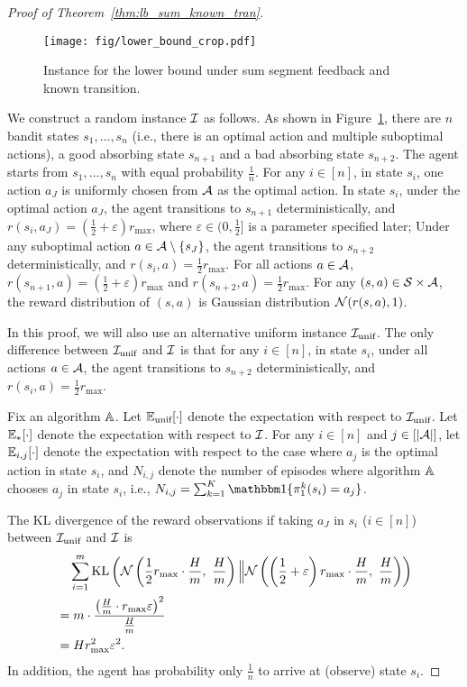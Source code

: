\begin{proof}[Proof of Theorem~\ref{thm:lb_sum_known_tran}]
	\begin{figure}[t]
		\centering   
		\texttt{[image: fig/lower\_bound\_crop.pdf]}
		\caption{Instance for the lower bound under sum segment feedback and known transition.
		} \label{fig:lb_sum_known_tran}
	\end{figure}
	
	We construct a random instance $\mathcal{I}$ as follows. As shown in Figure~\ref{fig:lb_sum_known_tran},
	there are $n$ bandit states $s_1,\dots,s_n$ (i.e., there is an optimal action and multiple suboptimal actions), a good absorbing state $s_{n+1}$ and a bad absorbing state $s_{n+2}$. 
	The agent starts from $s_1,\dots,s_n$ with equal probability $\frac{1}{n}$. 
	For any $i \in [n]$, in state $s_i$, one action $a_J$ is uniformly chosen from $\mathcal{A}$ as the optimal action.
	In state $s_i$, under the optimal action $a_J$, the agent transitions to $s_{n+1}$ deterministically, and $r(s_i,a_J)=(\frac{1}{2}+\varepsilon)r_{\max}$, where $\varepsilon \in (0,\frac{1}{2}]$ is a parameter specified later; Under any suboptimal action $a \in \mathcal{A} \setminus \{s_J\}$, the agent transitions to $s_{n+2}$ deterministically, and $r(s_i,a)=\frac{1}{2}r_{\max}$. 
	For all actions $a \in \mathcal{A}$, $r(s_{n+1},a)=(\frac{1}{2}+\varepsilon)r_{\max}$ and $r(s_{n+2},a)=\frac{1}{2}r_{\max}$.
	For any $(s,a) \in \mathcal{S} \times \mathcal{A}$, the reward distribution of $(s,a)$ is Gaussian distribution $\mathcal{N}(r(s,a),1)$.
	
	In this proof, we will also use an alternative uniform instance $\mathcal{I}_{\textup{unif}}$. The only difference between $\mathcal{I}_{\textup{unif}}$ and $\mathcal{I}$ is that for any $i \in [n]$, in state $s_i$, under all actions $a \in \mathcal{A}$, the agent transitions to $s_{n+2}$ deterministically, and $r(s_i,a)=\frac{1}{2}r_{\max}$.
	
	Fix an algorithm $\mathbb{A}$.
	Let $\mathbb{E}_{\textup{unif}}[\cdot]$ denote the expectation with respect to $\mathcal{I}_{\textup{unif}}$. Let $\mathbb{E}_*[\cdot]$ denote the expectation with respect to $\mathcal{I}$. For any $i \in [n]$ and $j \in [|\mathcal{A}|]$, let $\mathbb{E}_{i,j}[\cdot]$ denote the expectation with respect to the case where $a_j$ is the optimal action in state $s_i$, and  $N_{i,j}$ denote the number of episodes where algorithm $\mathbb{A}$ chooses $a_j$ in state $s_i$, i.e., $N_{i,j}=\sum_{k=1}^{K} \indicator\{\pi^k_1(s_i)=a_j\}$. 
	

	The KL divergence of the reward observations if taking $a_J$ in $s_i$ ($i \in [n]$) between $\mathcal{I}_{\textup{unif}}$ and $\mathcal{I}$ is 
	\begin{align*}
		& \quad \sum_{i=1}^{m} \kl \sbr{ \cN\sbr{ \frac{1}{2} r_{\max} \cdot \frac{H}{m},\ \frac{H}{m}} \Big\| \cN\sbr{\sbr{\frac{1}{2}+\varepsilon} r_{\max} \cdot \frac{H}{m},\ \frac{H}{m}} } 
		\\
		&=  m \cdot \frac{ \sbr{\frac{H}{m} \cdot r_{\max} \varepsilon}^2 }{\frac{H}{m}}
		\\
		&=  H r_{\max}^2 \varepsilon^2 .
	\end{align*}  
	In addition, the agent has probability only $\frac{1}{n}$ to arrive at (observe) state $s_i$.
	

\end{proof}
